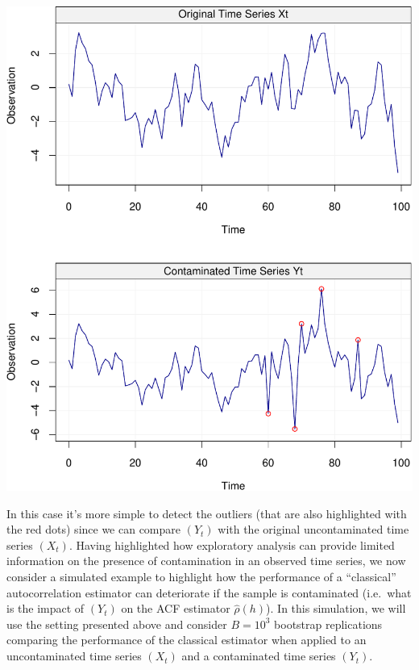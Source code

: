 \documentclass[]{book}
\theoremstyle{definition}
\theoremstyle{definition}
\theoremstyle{definition}
\theoremstyle{remark}
\begin{document}
\includegraphics{ts_files/figure-latex/XtYt-1.pdf}

In this case it's more simple to detect the outliers (that are also
highlighted with the red dots) since we can compare \((Y_t)\) with the
original uncontaminated time series \((X_t)\). Having highlighted how
exploratory analysis can provide limited information on the presence of
contamination in an observed time series, we now consider a simulated
example to highlight how the performance of a ``classical''
autocorrelation estimator can deteriorate if the sample is contaminated
(i.e.~what is the impact of \((Y_t)\) on the ACF estimator
\(\hat{\rho}(h)\)). In this simulation, we will use the setting
presented above and consider \(B = 10^3\) bootstrap replications
comparing the performance of the classical estimator when applied to an
uncontaminated time series \((X_t)\) and a contaminated time series
\((Y_t)\).
\end{document}
